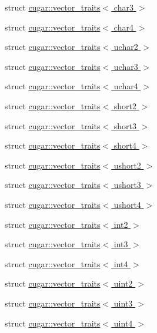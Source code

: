 \begin{DoxyCompactItemize}
\item 
struct \hyperlink{structcugar_1_1vector__traits_3_01char3_01_4}{cugar\+::vector\+\_\+traits$<$ char3 $>$}
\item 
struct \hyperlink{structcugar_1_1vector__traits_3_01char4_01_4}{cugar\+::vector\+\_\+traits$<$ char4 $>$}
\item 
struct \hyperlink{structcugar_1_1vector__traits_3_01uchar2_01_4}{cugar\+::vector\+\_\+traits$<$ uchar2 $>$}
\item 
struct \hyperlink{structcugar_1_1vector__traits_3_01uchar3_01_4}{cugar\+::vector\+\_\+traits$<$ uchar3 $>$}
\item 
struct \hyperlink{structcugar_1_1vector__traits_3_01uchar4_01_4}{cugar\+::vector\+\_\+traits$<$ uchar4 $>$}
\item 
struct \hyperlink{structcugar_1_1vector__traits_3_01short2_01_4}{cugar\+::vector\+\_\+traits$<$ short2 $>$}
\item 
struct \hyperlink{structcugar_1_1vector__traits_3_01short3_01_4}{cugar\+::vector\+\_\+traits$<$ short3 $>$}
\item 
struct \hyperlink{structcugar_1_1vector__traits_3_01short4_01_4}{cugar\+::vector\+\_\+traits$<$ short4 $>$}
\item 
struct \hyperlink{structcugar_1_1vector__traits_3_01ushort2_01_4}{cugar\+::vector\+\_\+traits$<$ ushort2 $>$}
\item 
struct \hyperlink{structcugar_1_1vector__traits_3_01ushort3_01_4}{cugar\+::vector\+\_\+traits$<$ ushort3 $>$}
\item 
struct \hyperlink{structcugar_1_1vector__traits_3_01ushort4_01_4}{cugar\+::vector\+\_\+traits$<$ ushort4 $>$}
\item 
struct \hyperlink{structcugar_1_1vector__traits_3_01int2_01_4}{cugar\+::vector\+\_\+traits$<$ int2 $>$}
\item 
struct \hyperlink{structcugar_1_1vector__traits_3_01int3_01_4}{cugar\+::vector\+\_\+traits$<$ int3 $>$}
\item 
struct \hyperlink{structcugar_1_1vector__traits_3_01int4_01_4}{cugar\+::vector\+\_\+traits$<$ int4 $>$}
\item 
struct \hyperlink{structcugar_1_1vector__traits_3_01uint2_01_4}{cugar\+::vector\+\_\+traits$<$ uint2 $>$}
\item 
struct \hyperlink{structcugar_1_1vector__traits_3_01uint3_01_4}{cugar\+::vector\+\_\+traits$<$ uint3 $>$}
\item 
struct \hyperlink{structcugar_1_1vector__traits_3_01uint4_01_4}{cugar\+::vector\+\_\+traits$<$ uint4 $>$}

\end{DoxyCompactItemize}
